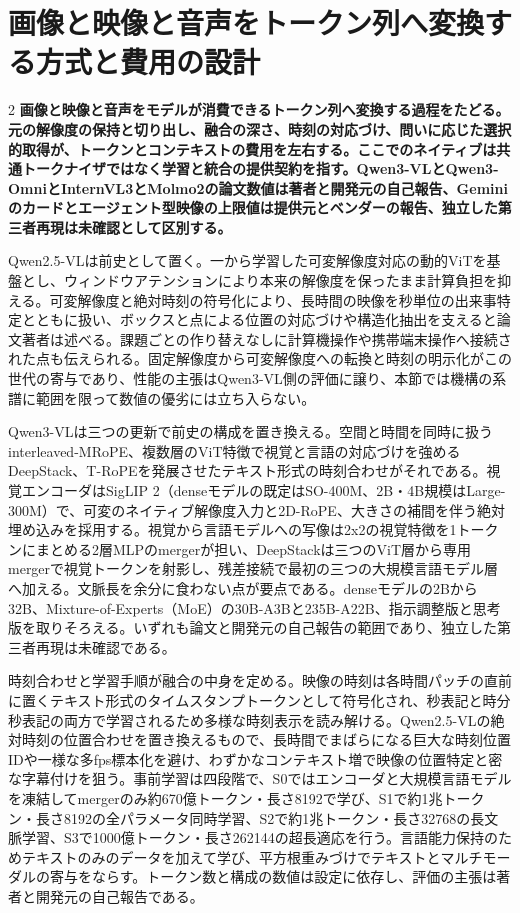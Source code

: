 \documentclass[lualatex,a4paper,10pt]{jlreq}
\begin{document}
\section{画像と映像と音声をトークン列へ変換する方式と費用の設計}
\label{sec:p09}
\begin{multicols}{2}
\raggedcolumns
\noindent\textbf{画像と映像と音声をモデルが消費できるトークン列へ変換する過程をたどる。元の解像度の保持と切り出し、融合の深さ、時刻の対応づけ、問いに応じた選択的取得が、トークンとコンテキストの費用を左右する。ここでのネイティブは共通トークナイザではなく学習と統合の提供契約を指す。Qwen3-VLとQwen3-OmniとInternVL3とMolmo2の論文数値は著者と開発元の自己報告、Geminiのカードとエージェント型映像の上限値は提供元とベンダーの報告、独立した第三者再現は未確認として区別する。}\autocite{vmd065,vmd066,vmd070,vmd112}\par\medskip
\noindent Qwen2.5-VLは前史として置く。一から学習した可変解像度対応の動的ViTを基盤とし、ウィンドウアテンションにより本来の解像度を保ったまま計算負担を抑える。可変解像度と絶対時刻の符号化により、長時間の映像を秒単位の出来事特定とともに扱い、ボックスと点による位置の対応づけや構造化抽出を支えると論文著者は述べる。課題ごとの作り替えなしに計算機操作や携帯端末操作へ接続された点も伝えられる。固定解像度から可変解像度への転換と時刻の明示化がこの世代の寄与であり、性能の主張はQwen3-VL側の評価に譲り、本節では機構の系譜に範囲を限って数値の優劣には立ち入らない。\autocite{vmd064}\par\medskip
\noindent Qwen3-VLは三つの更新で前史の構成を置き換える。空間と時間を同時に扱うinterleaved-MRoPE、複数層のViT特徴で視覚と言語の対応づけを強めるDeepStack、T-RoPEを発展させたテキスト形式の時刻合わせがそれである。視覚エンコーダはSigLIP 2（denseモデルの既定はSO-400M、2B・4B規模はLarge-300M）で、可変のネイティブ解像度入力と2D-RoPE、大きさの補間を伴う絶対埋め込みを採用する。視覚から言語モデルへの写像は2x2の視覚特徴を1トークンにまとめる2層MLPのmergerが担い、DeepStackは三つのViT層から専用mergerで視覚トークンを射影し、残差接続で最初の三つの大規模言語モデル層へ加える。文脈長を余分に食わない点が要点である。denseモデルの2Bから32B、Mixture-of-Experts（MoE）の30B-A3Bと235B-A22B、指示調整版と思考版を取りそろえる。いずれも論文と開発元の自己報告の範囲であり、独立した第三者再現は未確認である。\autocite{vmd065}\par\medskip
\noindent 時刻合わせと学習手順が融合の中身を定める。映像の時刻は各時間パッチの直前に置くテキスト形式のタイムスタンプトークンとして符号化され、秒表記と時分秒表記の両方で学習されるため多様な時刻表示を読み解ける。Qwen2.5-VLの絶対時刻の位置合わせを置き換えるもので、長時間でまばらになる巨大な時刻位置IDや一様な多fps標本化を避け、わずかなコンテキスト増で映像の位置特定と密な字幕付けを狙う。事前学習は四段階で、S0ではエンコーダと大規模言語モデルを凍結してmergerのみ約670億トークン・長さ8192で学び、S1で約1兆トークン・長さ8192の全パラメータ同時学習、S2で約1兆トークン・長さ32768の長文脈学習、S3で1000億トークン・長さ262144の超長適応を行う。言語能力保持のためテキストのみのデータを加えて学び、平方根重みづけでテキストとマルチモーダルの寄与をならす。トークン数と構成の数値は設定に依存し、評価の主張は著者と開発元の自己報告である。\autocite{vmd065}\par\medskip

\end{multicols}
\end{document}
